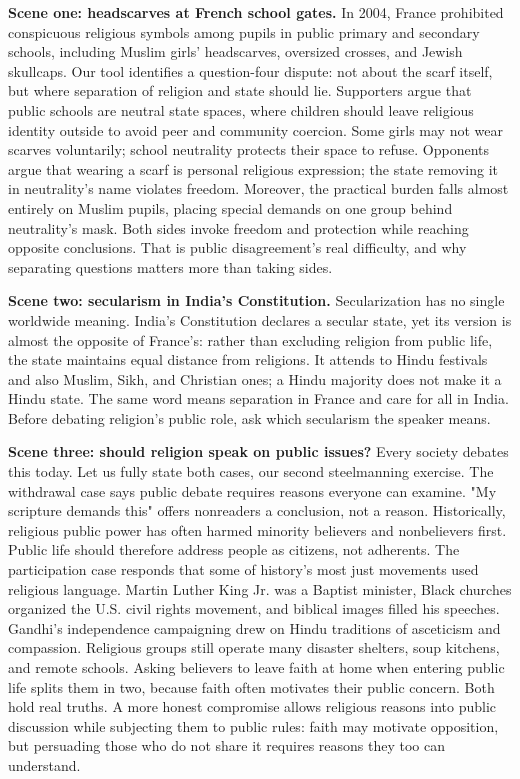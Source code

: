 \textbf{Scene one: headscarves at French school gates.} In 2004, France prohibited conspicuous religious symbols among pupils in public primary and secondary schools, including Muslim girls' headscarves, oversized crosses, and Jewish skullcaps. Our tool identifies a question-four dispute: not about the scarf itself, but where separation of religion and state should lie. Supporters argue that public schools are neutral state spaces, where children should leave religious identity outside to avoid peer and community coercion. Some girls may not wear scarves voluntarily; school neutrality protects their space to refuse. Opponents argue that wearing a scarf is personal religious expression; the state removing it in neutrality's name violates freedom. Moreover, the practical burden falls almost entirely on Muslim pupils, placing special demands on one group behind neutrality's mask. Both sides invoke freedom and protection while reaching opposite conclusions. That is public disagreement's real difficulty, and why separating questions matters more than taking sides.

\textbf{Scene two: secularism in India's Constitution.} Secularization has no single worldwide meaning. India's Constitution declares a secular state, yet its version is almost the opposite of France's: rather than excluding religion from public life, the state maintains equal distance from religions. It attends to Hindu festivals and also Muslim, Sikh, and Christian ones; a Hindu majority does not make it a Hindu state. The same word means separation in France and care for all in India. Before debating religion's public role, ask which secularism the speaker means.

\textbf{Scene three: should religion speak on public issues?} Every society debates this today. Let us fully state both cases, our second steelmanning exercise. The withdrawal case says public debate requires reasons everyone can examine. "My scripture demands this" offers nonreaders a conclusion, not a reason. Historically, religious public power has often harmed minority believers and nonbelievers first. Public life should therefore address people as citizens, not adherents. The participation case responds that some of history's most just movements used religious language. Martin Luther King Jr. was a Baptist minister, Black churches organized the U.S. civil rights movement, and biblical images filled his speeches. Gandhi's independence campaigning drew on Hindu traditions of asceticism and compassion. Religious groups still operate many disaster shelters, soup kitchens, and remote schools. Asking believers to leave faith at home when entering public life splits them in two, because faith often motivates their public concern. Both hold real truths. A more honest compromise allows religious reasons into public discussion while subjecting them to public rules: faith may motivate opposition, but persuading those who do not share it requires reasons they too can understand.

